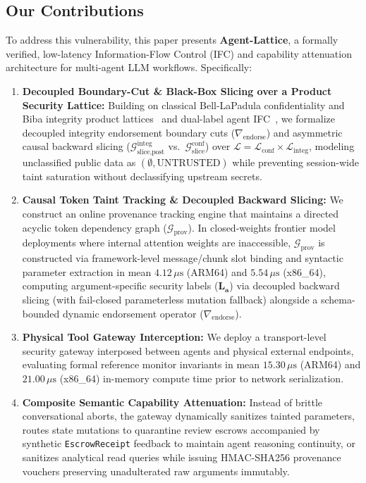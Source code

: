 \documentclass[conference,10pt]{IEEEtran}
\begin{document}
\subsection{Our Contributions}
To address this vulnerability, this paper presents \textbf{Agent-Lattice}, a formally verified, low-latency Information-Flow Control (IFC) and capability attenuation architecture for multi-agent LLM workflows. Specifically:
\begin{enumerate}
    \item \textbf{Decoupled Boundary-Cut \& Black-Box Slicing over a Product Security Lattice:} Building on classical Bell-LaPadula confidentiality and Biba integrity product lattices~\cite{denning1976lattice, bell1973secure, biba1977integrity} and dual-label agent IFC~\cite{costa2025fides, li2025safeflow}, we formalize decoupled integrity endorsement boundary cuts ($\nabla_{\text{endorse}}$) and asymmetric causal backward slicing ($\mathcal{G}_{\text{slice,post}}^{\text{integ}}$ vs.\ $\mathcal{G}_{\text{slice}}^{\text{conf}}$) over $\mathcal{L} = \mathcal{L}_{\text{conf}} \times \mathcal{L}_{\text{integ}}$, modeling unclassified public data as $(\emptyset, \text{UNTRUSTED})$ while preventing session-wide taint saturation without declassifying upstream secrets.
    \item \textbf{Causal Token Taint Tracking \& Decoupled Backward Slicing:} We construct an online provenance tracking engine that maintains a directed acyclic token dependency graph ($\mathcal{G}_{\text{prov}}$). In closed-weights frontier model deployments where internal attention weights are inaccessible, $\mathcal{G}_{\text{prov}}$ is constructed via framework-level message/chunk slot binding and syntactic parameter extraction in mean $4.12\,\mu\text{s}$ (ARM64) and $5.54\,\mu\text{s}$ (x86\_64), computing argument-specific security labels ($\mathbf{L}_{\mathbf{a}}$) via decoupled backward slicing (with fail-closed parameterless mutation fallback) alongside a schema-bounded dynamic endorsement operator ($\nabla_{\text{endorse}}$).
    \item \textbf{Physical Tool Gateway Interception:} We deploy a transport-level security gateway interposed between agents and physical external endpoints, evaluating formal reference monitor invariants in mean $15.30\,\mu\text{s}$ (ARM64) and $21.00\,\mu\text{s}$ (x86\_64) in-memory compute time prior to network serialization.
    \item \textbf{Composite Semantic Capability Attenuation:} Instead of brittle conversational aborts, the gateway dynamically sanitizes tainted parameters, routes state mutations to quarantine review escrows accompanied by synthetic \texttt{EscrowReceipt} feedback to maintain agent reasoning continuity, or sanitizes analytical read queries while issuing HMAC-SHA256 provenance vouchers preserving unadulterated raw arguments immutably.

\end{enumerate}
\end{document}
